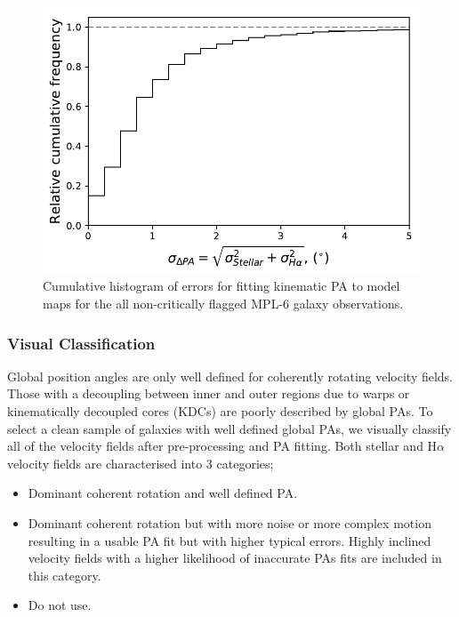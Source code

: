 \begin{figure}
    \centering
	\includegraphics[width=0.6\linewidth]{thesis/latex/misalignment_MaNGA/cumulative_model_errors.pdf}
    \caption{Cumulative histogram of errors for fitting kinematic PA to model maps for the all non-critically flagged MPL-6 galaxy observations.}
    \label{fig:model_errors}
\end{figure}

\subsubsection{Visual Classification}
Global position angles are only well defined for coherently rotating velocity fields. Those with a decoupling between inner and outer regions due to warps or kinematically decoupled cores (KDCs) are poorly described by global PAs. To select a clean sample of galaxies with well defined global PAs, we visually classify all of the velocity fields after pre-processing and PA fitting. Both stellar and H$\alpha$ velocity fields are characterised into 3 categories;
\begin{itemize}
    \item Dominant coherent rotation and well defined PA.
    \item Dominant coherent rotation but with more noise or more complex motion resulting in a usable PA fit but with higher typical errors. Highly inclined velocity fields with a higher likelihood of inaccurate PAs fits are included in this category. 
    \item Do not use.
\end{itemize}

